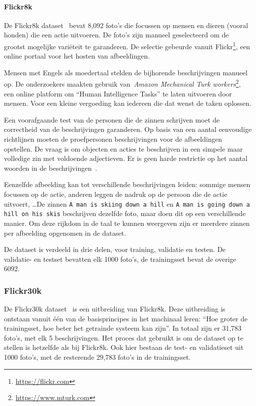 \paragraph{Flickr8k}
\label{par:Flickr8k}
De Flickr8k dataset~\cite{Hodosh2013} bevat 8,092 foto's die focussen op mensen en dieren (vooral honden) die een actie uitvoeren. De foto's zijn manueel geselecteerd om de grootst mogelijke vari\"eteit te garanderen. De selectie gebeurde vanuit Flickr\footnote{\url{https://flickr.com}}, een online portaal voor het hosten van afbeeldingen.

Mensen met Engels als moedertaal stelden de bijhorende beschrijvingen manueel op. De onderzoekers maakten gebruik van~\emph{Amazon Mechanical Turk workers}\footnote{\url{https://www.mturk.com}}, een online platform om ``Human Intelligence Tasks'' te laten uitvoeren door mensen. Voor een kleine vergoeding kan iedereen die dat wenst de taken oplossen. 

Een voorafgaande test van de personen die de zinnen schrijven moet de correctheid van de beschrijvingen garanderen. Op basis van een aantal eenvoudige richtlijnen moeten de proefpersonen beschrijvingen voor de afbeeldingen opstellen. De vraag is om objecten en acties te beschrijven in een simpele maar volledige zin met voldoende adjectieven. Er is geen harde restrictie op het aantal woorden in de beschrijvingen~\cite{Hockenmaier2014}.

Eenzelfde afbeelding kan tot verschillende beschrijvingen leiden: sommige mensen focussen op de actie, anderen leggen de nadruk op de persoon die de actie uitvoert, \ldots  De zinnen \texttt{A man is skiing down a hill} en \texttt{A man is going down a hill on his skis} beschrijven dezelfde foto, maar doen dit op een verschillende manier. Om deze rijkdom in de taal te kunnen weergeven zijn er meerdere zinnen per afbeelding opgenomen in de dataset.

De dataset is verdeeld in drie delen, voor training, validatie en testen. De validatie- en testset bevatten elk 1000 foto's, de trainingsset bevat de overige 6092.


\subsubsection{Flickr30k}
\label{par:Flickr30k}
De Flickr30k dataset~\cite{Young2014} is een uitbreiding van Flickr8k. Deze uitbreiding is ontstaan vanuit \'e\'en van de basisprincipes in het machinaal leren: ``Hoe groter de trainingsset, hoe beter het getrainde systeem kan zijn''. In totaal zijn er 31,783 foto's, met elk 5 beschrijvingen. Het proces dat gebruikt is om de dataset op te stellen is hetzelfde als bij Flickr8k. Ook hier bestaan de test- en validatieset uit 1000 foto's, met de resterende 29,783 foto's in de trainingsset.


